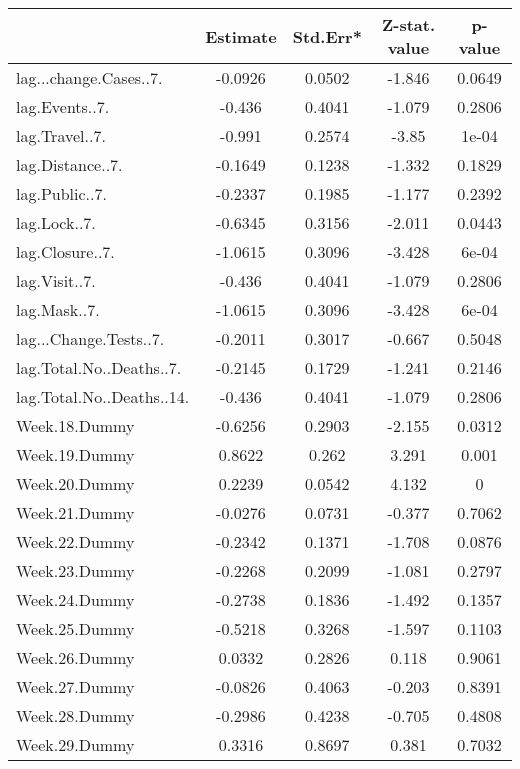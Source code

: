 \begingroup\tiny
\begin{longtable}{lcccc}
  \toprule
 & Estimate & Std.Err* & Z-stat. value & p-value \\ 
  \midrule
lag...change.Cases..7. & -0.0926 & 0.0502 & -1.846 & 0.0649 \\ 
  lag.Events..7. & -0.436 & 0.4041 & -1.079 & 0.2806 \\ 
  lag.Travel..7. & -0.991 & 0.2574 & -3.85 & 1e-04 \\ 
  lag.Distance..7. & -0.1649 & 0.1238 & -1.332 & 0.1829 \\ 
  lag.Public..7. & -0.2337 & 0.1985 & -1.177 & 0.2392 \\ 
  lag.Lock..7. & -0.6345 & 0.3156 & -2.011 & 0.0443 \\ 
  lag.Closure..7. & -1.0615 & 0.3096 & -3.428 & 6e-04 \\ 
  lag.Visit..7. & -0.436 & 0.4041 & -1.079 & 0.2806 \\ 
  lag.Mask..7. & -1.0615 & 0.3096 & -3.428 & 6e-04 \\ 
  lag...Change.Tests..7. & -0.2011 & 0.3017 & -0.667 & 0.5048 \\ 
  lag.Total.No..Deaths..7. & -0.2145 & 0.1729 & -1.241 & 0.2146 \\ 
  lag.Total.No..Deaths..14. & -0.436 & 0.4041 & -1.079 & 0.2806 \\ 
  Week.18.Dummy & -0.6256 & 0.2903 & -2.155 & 0.0312 \\ 
  Week.19.Dummy & 0.8622 & 0.262 & 3.291 & 0.001 \\ 
  Week.20.Dummy & 0.2239 & 0.0542 & 4.132 & 0 \\ 
  Week.21.Dummy & -0.0276 & 0.0731 & -0.377 & 0.7062 \\ 
  Week.22.Dummy & -0.2342 & 0.1371 & -1.708 & 0.0876 \\ 
  Week.23.Dummy & -0.2268 & 0.2099 & -1.081 & 0.2797 \\ 
  Week.24.Dummy & -0.2738 & 0.1836 & -1.492 & 0.1357 \\ 
  Week.25.Dummy & -0.5218 & 0.3268 & -1.597 & 0.1103 \\ 
  Week.26.Dummy & 0.0332 & 0.2826 & 0.118 & 0.9061 \\ 
  Week.27.Dummy & -0.0826 & 0.4063 & -0.203 & 0.8391 \\ 
  Week.28.Dummy & -0.2986 & 0.4238 & -0.705 & 0.4808 \\ 
  Week.29.Dummy & 0.3316 & 0.8697 & 0.381 & 0.7032 \\ 

\end{longtable}
